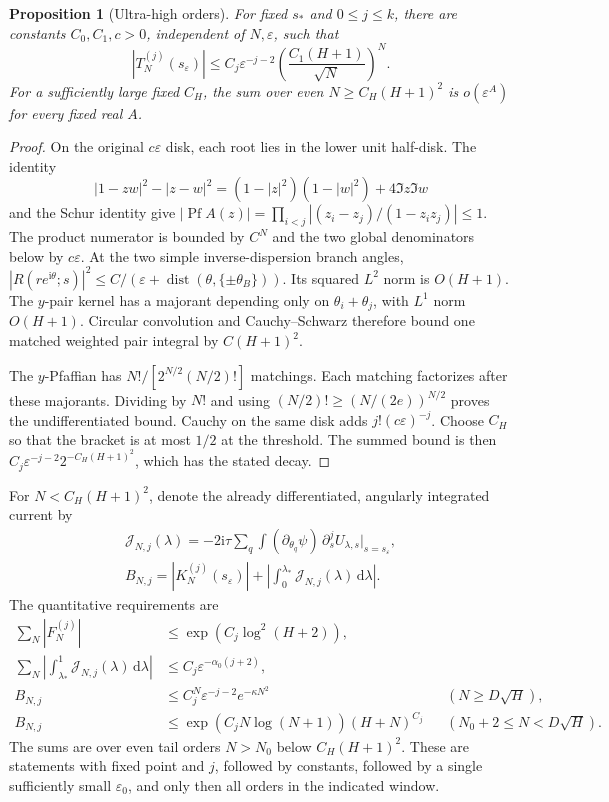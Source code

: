 \documentclass[11pt]{article}
\numberwithin{equation}{section}
\newtheorem{proposition}[theorem]{Proposition}
\theoremstyle{definition}
\newcommand{\dd}{\,\mathrm d}
\newcommand{\ii}{\mathrm i}
\newcommand{\eps}{\varepsilon}
\newcommand{\Pf}{\operatorname{Pf}}
\newcommand{\dist}{\operatorname{dist}}
\newcommand{\sstar}{s_*}
\newcommand{\se}{s_\varepsilon}
\begin{document}
\begin{proposition}[Ultra-high orders]\label{prop:ultrahigh}
For fixed \(\sstar\) and \(0\le j\le k\), there are constants
\(C_0,C_1,c>0\), independent of \(N,\eps\), such that
\[
 |T_N^{(j)}(\se)|
 \le C_j\eps^{-j-2}\left(\frac{C_1(H+1)}{\sqrt N}\right)^N.
\]
For a sufficiently large fixed \(C_H\),
the sum over even \(N\ge C_H(H+1)^2\) is \(o(\eps^A)\)
for every fixed real \(A\).
\end{proposition}
\begin{proof}
On the original \(c\eps\) disk, each root lies in the lower unit
half-disk. The identity
\[
 |1-zw|^2-|z-w|^2=(1-|z|^2)(1-|w|^2)+4\Im z\Im w
\]
and the Schur identity give
\(|\Pf A(z)|=\prod_{i<j}|(z_i-z_j)/(1-z_iz_j)|\le1\).
The product numerator is bounded by \(C^N\) and the two global
denominators below by \(c\eps\).
At the two simple inverse-dispersion branch angles,
\(|R(re^{\ii\theta};s)|^2\le C/(\eps+\dist(\theta,\{\pm\theta_B\}))\).
Its squared \(L^2\) norm is \(O(H+1)\). The \(y\)-pair kernel has a
majorant depending only on \(\theta_i+\theta_j\), with \(L^1\) norm
\(O(H+1)\). Circular convolution and Cauchy--Schwarz therefore bound
one matched weighted pair integral by \(C(H+1)^2\).

The \(y\)-Pfaffian has \(N!/[2^{N/2}(N/2)!]\) matchings.
Each matching factorizes after these majorants. Dividing by \(N!\)
and using \((N/2)!\ge(N/(2e))^{N/2}\) proves the undifferentiated
bound. Cauchy on the same disk adds \(j!(c\eps)^{-j}\).
Choose \(C_H\) so that the bracket is at most \(1/2\) at the threshold.
The summed bound is then
\(C_j\eps^{-j-2}2^{-C_H(H+1)^2}\), which has the stated decay.
\end{proof}

For \(N<C_H(H+1)^2\), denote the already differentiated,
angularly integrated current by
\begin{gather*}
 \mathcal J_{N,j}(\lambda)
   =-2\ii\tau\sum_q\int(\partial_{\theta_q}\psi)\,
              \partial_s^j U_{\lambda,s}\big|_{s=s_\eps},\\
 B_{N,j}=|K_N^{(j)}(s_\eps)|
       +\left|\int_0^{\lambda_*}\mathcal J_{N,j}(\lambda)\dd\lambda\right|.
\end{gather*}
The quantitative requirements are
\begin{align}
 \sum_N|F_N^{(j)}|
   &\le \exp(C_j\log^2(H+2)),\label{eq:reqF}\\
 \sum_N\left|\int_{\lambda_*}^1
               \mathcal J_{N,j}(\lambda)\dd\lambda\right|
   &\le C_j\eps^{-\alpha_0(j+2)},\label{eq:reqLS}\\
 B_{N,j}
   &\le C_j^N\eps^{-j-2}e^{-\kappa N^2}
             &&(N\ge D\sqrt H),\label{eq:reqhigh}\\
 B_{N,j}
   &\le \exp(C_jN\log(N+1))(H+N)^{C_j}
             &&(N_0+2\le N<D\sqrt H).\label{eq:reqinter}
\end{align}
The sums are over even tail orders \(N>N_0\) below \(C_H(H+1)^2\).
These are statements with fixed point and \(j\), followed by constants,
followed by a single sufficiently small \(\eps_0\), and only then all
orders in the indicated window.
\end{document}
